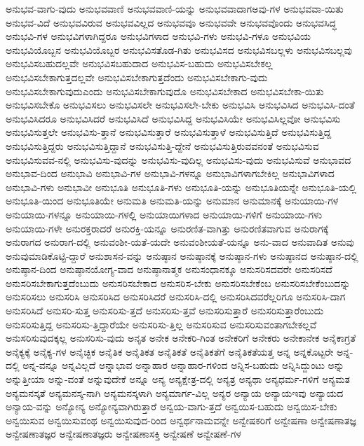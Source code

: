 {ಅನುಭವ-ವಾಗು-ವುದು
ಅನುಭವವಾಣಿ
ಅನುಭವವಾಣಿ-ಯನ್ನು
ಅನುಭವವಾದಾಗಅವು-ಗಳ
ಅನುಭವವಾ-ಯಿತು
ಅನುಭವ-ವಿದೆ
ಅನುಭವವಿರುವ
ಅನುಭವವಿಲ್ಲದ
ಅನುಭವವೂ
ಅನುಭವವೇ
ಅನುಭವವೊಂದು
ಅನುಭವಸಿದ್ಧ
ಅನುಭವಿ-ಗಳ
ಅನುಭವಿಗಳಾಗಿದ್ದರೂ
ಅನುಭವಿಗಳಾದ
ಅನುಭವಿ-ಗಳು
ಅನುಭವಿ-ಗಳೂ
ಅನುಭವಿಯ
ಅನುಭವಿಯೊಬ್ಬನ
ಅನುಭವಿಯೊಬ್ಬರ
ಅನುಭವಿಸತೊಡ-ಗಿತು
ಅನುಭವಿಸದ
ಅನುಭವಿಸಬಲ್ಲಳು
ಅನುಭವಿಸಬಲ್ಲವು
ಅನುಭವಿಸಬಹುದಲ್ಲವೇ
ಅನುಭವಿಸಬಹುದಾದ
ಅನುಭವಿಸ-ಬಹುದು
ಅನುಭವಿಸಬೇಕಲ್ಲ
ಅನುಭವಿಸಬೇಕಾಗುತ್ತದಲ್ಲವೇ
ಅನುಭವಿಸಬೇಕಾಗುತ್ತದೆಂದು
ಅನುಭವಿಸಬೇಕಾಗು-ವುದು
ಅನುಭವಿಸಬೇಕಾಗುವುದುಎಂದು
ಅನುಭವಿಸಬೇಕಾಗುವುದೊ
ಅನುಭವಿಸಬೇಕಾದ
ಅನುಭವಿಸಬೇಕಾ-ಯಿತು
ಅನುಭವಿಸಬೇಕೊ
ಅನುಭವಿಸಲು
ಅನುಭವಿಸಲೇ
ಅನುಭವಿಸಲೇ-ಬೇಕು
ಅನುಭವಿಸಿ
ಅನುಭವಿಸಿದ
ಅನುಭವಿಸಿ-ದಂತೆ
ಅನುಭವಿಸಿದರೂ
ಅನುಭವಿಸಿದರೆ
ಅನುಭವಿಸಿದೆ
ಅನುಭವಿಸಿದ್ದ
ಅನುಭವಿಸಿಯೇ
ಅನುಭವಿಸಿಲ್ಲವೋ
ಅನುಭವಿಸು
ಅನುಭವಿಸುತ್ತಲೇ
ಅನುಭವಿಸು-ತ್ತಾನೆ
ಅನುಭವಿಸುತ್ತಾರೆ
ಅನುಭವಿಸುತ್ತಾಳೆ
ಅನುಭವಿಸುತ್ತಿದೆ
ಅನುಭವಿಸುತ್ತಿದ್ದ
ಅನುಭವಿಸುತ್ತಿದ್ದರು
ಅನುಭವಿಸುತ್ತಿದ್ದಾನೆ
ಅನುಭವಿಸುತ್ತಿ-ದ್ದೇನೆ
ಅನುಭವಿಸುತ್ತಿರುವವನಂತೆ
ಅನುಭವಿಸುವ
ಅನುಭವಿಸುವವ-ನಲ್ಲಿ
ಅನುಭವಿಸು-ವುದನ್ನು
ಅನುಭವಿಸು-ವುದಿಲ್ಲ
ಅನುಭವಿಸು-ವುದು
ಅನುಭವಿಸುವೆ
ಅನುಭಾವದ
ಅನುಭಾವ-ದಿಂದ
ಅನುಭಾವಿ
ಅನುಭಾವಿ-ಗಳ
ಅನುಭಾವಿ-ಗಳನ್ನೂ
ಅನುಭಾವಿಗಳಾಗಬೇಕಿಲ್ಲ
ಅನುಭಾವಿಗಳಾದ
ಅನುಭಾವಿ-ಗಳು
ಅನುಭಾವೀ
ಅನುಭೂತಿ
ಅನುಭೂತಿ-ಗಳು
ಅನುಭೂತಿ-ಯನ್ನು
ಅನುಭೂತಿಯನ್ನೇ
ಅನುಭೂತಿ-ಯಲ್ಲಿ
ಅನುಭೂತಿ-ಯಿಂದ
ಅನುಭೂತಿಯೇ
ಅನುಮತಿ
ಅನುಮತಿ-ಯನ್ನು
ಅನುಮಾನ
ಅನುಮಾನಕ್ಕೆ
ಅನುಯಾಯಿ-ಗಳ
ಅನುಯಾಯಿ-ಗಳನ್ನೂ
ಅನುಯಾಯಿ-ಗಳಲ್ಲಿ
ಅನುಯಾಯಿಗಳಾದ
ಅನುಯಾಯಿ-ಗಳಿಗೆ
ಅನುಯಾಯಿ-ಗಳು
ಅನುಯಾಯಿ-ಗಳೇ
ಅನುರಕ್ತರಾದರೆ
ಅನುರಕ್ತಿ-ಯನ್ನೂ
ಅನುರಣಿತ-ವಾಗಿತ್ತು
ಅನುರಣಿತವಾಗುವ
ಅನುರಾಗಕ್ಕೆ
ಅನುರಾಗದ
ಅನುರಾಗ-ದಲ್ಲಿ
ಅನುವಂಶೀ-ಯತೆ-ಯದೇ
ಅನುವಂಶೀಯತೆ-ಯನ್ನೂ
ಅನು-ವಾದ
ಅನುವಾದಿತ
ಅನುವು
ಅನುವುಮಾಡಿಕೊಟ್ಟಿ-ದ್ದಾರೆ
ಅನುಶಾಸನ-ವನ್ನು
ಅನುಷ್ಠಾನ
ಅನುಷ್ಠಾನಕ್ಕೆ
ಅನುಷ್ಠಾನ-ಗಳು
ಅನುಷ್ಠಾನದ
ಅನುಷ್ಠಾನ-ದಲ್ಲಿ
ಅನುಷ್ಠಾನ-ದಿಂದ
ಅನುಷ್ಠಾನಯೋಗ್ಯ-ವಾದ
ಅನುಷ್ಠಾನಾತ್ಮಕ
ಅನುಸಂಧಾನಕ್ಕೂ
ಅನುಸರಿಸದವರೇ
ಅನುಸರಿಸದೆ
ಅನುಸರಿಸಬೇಕಾಗುತ್ತದೆಂಬುದು
ಅನುಸರಿಸಬೇಕಾದ
ಅನುಸರಿಸ-ಬೇಕು
ಅನುಸರಿಸಬೇಕೆಂಬ
ಅನುಸರಿಸಬೇಕೆಂಬುದನ್ನು
ಅನುಸರಿಸಲು
ಅನುಸರಿಸಿ
ಅನುಸರಿಸಿದ
ಅನುಸರಿಸಿದರೆ
ಅನುಸರಿಸಿ-ದಲ್ಲಿ
ಅನುಸರಿಸಿದವರೆಲ್ಲರಿಗೂ
ಅನುಸರಿಸಿ-ದಾಗ
ಅನುಸರಿಸಿದೆ
ಅನುಸರಿ-ಸುತ್ತ
ಅನುಸರಿಸು-ತ್ತದೆ
ಅನುಸರಿಸು-ತ್ತವೆ
ಅನುಸರಿಸುತ್ತಾರೆ
ಅನುಸರಿಸುತ್ತಾರೆಂಬುದು
ಅನುಸರಿಸುತ್ತಿದ್ದ
ಅನುಸರಿಸು-ತ್ತಿದ್ದಾರೆಯೇ
ಅನುಸರಿಸು-ತ್ತಿಲ್ಲ
ಅನುಸರಿಸುವ
ಅನುಸರಿಸುವಂತಾಗಬೇಕಲ್ಲವೆ
ಅನುಸರಿಸುವುದಕ್ಕಲ್ಲ
ಅನುಸರಿಸು-ವುದು
ಅನೃತ
ಅನೇಕ
ಅನೇಕರಿ-ಗಿಂತ
ಅನೇಕರಿಗೆ
ಅನೇಕರು
ಅನೇಕಾನೇಕ
ಅನೈಕಾಗ್ರತೆ
ಅನೈಕ್ಯಕ್ಕೆ
ಅನೈಕ್ಯ-ಗಳ
ಅನೈಚ್ಛಿಕ
ಅನೈತಿಕ
ಅನೈತಿಕತ
ಅನೈತಿಕತೆ
ಅನೈತಿಕತೆಗೆ
ಅನೈತಿಕತೆಯತ್ತ
ಅನ್ನ
ಅನ್ನಕೊಟ್ಟರೇ
ಅನ್ನ-ದಲ್ಲಿ
ಅನ್ನ-ವನ್ನೂ
ಅನ್ನವಿಲ್ಲದೆ
ಅನ್ನಾಭಾವ
ಅನ್ನಾಹಾರ
ಅನ್ನಾಹಾರ-ಗಳಿಂದ
ಅನ್ನಿಸ-ಬಹುದು
ಅನ್ನಿಸಿದ್ದುಂಟು
ಅನ್ನು
ಅನ್ನುತ್ತೀಯಾ
ಅನ್ನು-ವಂತೆ
ಅನ್ನುವುದೇಕೆ
ಅನ್ನೂ
ಅನ್ಯ
ಅನ್ಯಕ್ಷೇತ್ರ-ದಲ್ಲಿ
ಅನ್ಯತ್ರ
ಅನ್ಯಥಾ
ಅನ್ಯಧರ್ಮ-ಗಳಿಗೆ
ಅನ್ಯಮತ
ಅನ್ಯಮನಸ್ಕತೆ
ಅನ್ಯಮನಸ್ಕ-ನಾಗಿ
ಅನ್ಯಮನಸ್ಕಳಾಗಿ
ಅನ್ಯಮಾರ್ಗ-ವಿಲ್ಲ
ಅನ್ಯರ
ಅನ್ಯಾಯ
ಅನ್ಯಾಯಇವು
ಅನ್ಯಾಯದ
ಅನ್ಯಾಯ-ವನ್ನು
ಅನ್ಯೋನ್ಯ
ಅನ್ಯೋನ್ಯವಾಗಿರುತ್ತಾರೆ
ಅನ್ವಯ-ವಾಗು-ತ್ತದೆ
ಅನ್ವಯಿಸ-ಬಹುದು
ಅನ್ವಯಿಸ-ಬೇಕು
ಅನ್ವಯಿಸುವ
ಅನ್ವಯಿಸುವಂಥ
ಅನ್ವಯಿಸುವುದ-ರಿಂದ
ಅನ್ವರ್ಥನಾಮವನ್ನೇ
ಅನ್ವೇಷಕರಿಗೆ
ಅನ್ವೇಷಣಾ
ಅನ್ವೇಷಣಾತಜ್ಞ
ಅನ್ವೇಷಣಾತಜ್ಞರ
ಅನ್ವೇಷಣಾತಜ್ಞರು
ಅನ್ವೇಷಣಾಸಕ್ತಿ
ಅನ್ವೇಷಣೆ
ಅನ್ವೇಷಣೆ-ಗಳ
}
